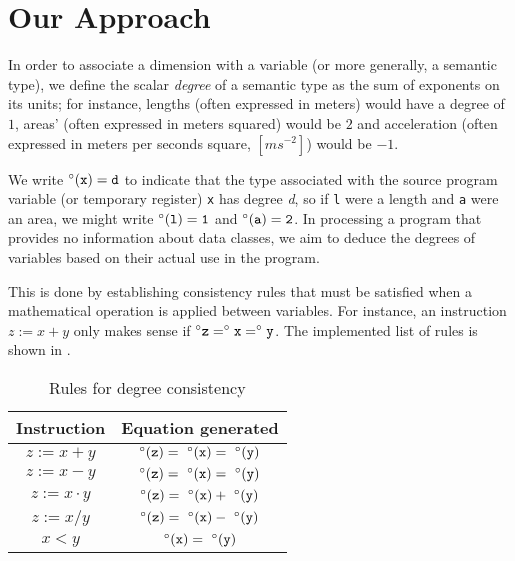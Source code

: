 \documentclass[12pt]{article}
\begin{document}
\section{Our Approach}
\label{sec:approach}

In order to associate a dimension with a variable (or more generally, a semantic type), we define the scalar \textit{degree} of a semantic type as the sum of exponents on its units; for instance, lengths (often expressed in meters) would have a degree of $1$, areas' (often expressed in meters squared) would be $2$ and acceleration (often expressed in meters per seconds square, $[m s^{-2}]$) would be $-1$.

We write $\degree(\tt{x}) = d$ to indicate that the type associated with the source program variable (or temporary register) \texttt{x} has degree \textit{d}, so if \texttt{l} were a length and \texttt{a} were an area, we might write $\degree(\tt{l}) = 1$ and $\degree(\tt{a}) = 2$.
In processing a program that provides no information about data classes, we aim to deduce the degrees of variables based on their actual use in the program.

This is done by establishing consistency rules that must be satisfied when a mathematical operation is applied between variables.
For instance, an instruction $z := x + y$ only makes sense if $\degree{\tt{z}} = \degree{\tt{x}} = \degree{\tt{y}}$.
The implemented list of rules is shown in .

\begin{table}[H]
  \centering
  \setlength{\tabcolsep}{20pt}
  \begin{tabular}{c | c}
    \textbf{Instruction} & \textbf{Equation generated} \\
    \hline
    $z := x + y$ & $\degree(\tt{z}) =\ \degree(\tt{x}) =\ \degree(\tt{y})$ \\
    $z := x - y$ & $\degree(\tt{z}) =\ \degree(\tt{x}) =\ \degree(\tt{y})$ \\
    $z := x \cdot y$ & $\degree(\tt{z}) =\ \degree(\tt{x}) +\ \degree(\tt{y})$ \\
    $z := x / y$ & $\degree(\tt{z}) =\ \degree(\tt{x}) -\ \degree(\tt{y})$ \\
    $x < y$ & $\degree(\tt{x}) =\ \degree(\tt{y})$ \\
  \end{tabular}
  \caption{Rules for degree consistency}
  \label{table:dimensional-rules}
\end{table}
\end{document}
